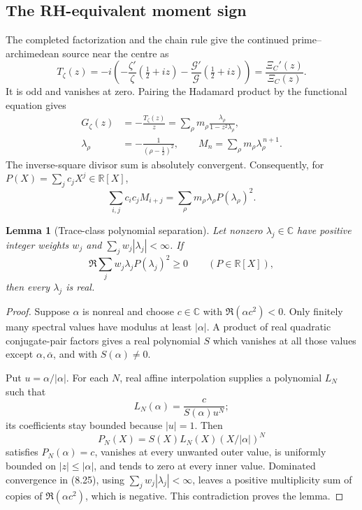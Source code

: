\documentclass[11pt]{article}
\newtheorem{lemma}[theorem]{Lemma}
\newcommand{\C}{\mathbb C}
\newcommand{\R}{\mathbb R}
\newcommand{\cG}{\mathcal G}
\begin{document}
\subsection{The RH-equivalent moment sign}

The completed factorization and the chain rule give the continued prime--archimedean source
near the centre as
\[
 T_\zeta(z)=
 -i\left(
 -\frac{\zeta'}{\zeta}(\tfrac12+iz)
 -\frac{\cG'}{\cG}(\tfrac12+iz)\right)
 =\frac{\Xi_C'(z)}{\Xi_C(z)}.
\tag{8.22}
\]
It is odd and vanishes at zero.  Pairing the Hadamard product by the functional equation gives
\cite[Chapter 2]{Titchmarsh1986}
\[
\begin{aligned}
 G_\zeta(z)
 &=-\frac{T_\zeta(z)}z
 =\sum_\rho m_\rho\frac{\lambda_\rho}{1-z^2\lambda_\rho},\\
 \lambda_\rho&=-\frac1{(\rho-\frac12)^2},\qquad
 M_n=\sum_\rho m_\rho\lambda_\rho^{\,n+1}.
\end{aligned}
\tag{8.23}
\]
The inverse-square divisor sum is absolutely convergent.  Consequently, for
\(P(X)=\sum_jc_jX^j\in\R[X]\),
\[
 \sum_{i,j}c_ic_jM_{i+j}
 =\sum_\rho m_\rho\lambda_\rho P(\lambda_\rho)^2.
\tag{8.24}
\]

\begin{lemma}[Trace-class polynomial separation]\label{lem:trace-separation}
Let nonzero \(\lambda_j\in\C\) have positive integer weights \(w_j\) and
\(\sum_jw_j|\lambda_j|<\infty\).  If
\[
 \Re\sum_jw_j\lambda_jP(\lambda_j)^2\ge0
 \qquad(P\in\R[X]),
\tag{8.25}
\]
then every \(\lambda_j\) is real.
\end{lemma}

\begin{proof}
Suppose \(\alpha\) is nonreal and choose \(c\in\C\) with
\(\Re(\alpha c^2)<0\).  Only finitely many spectral values have modulus at least
\(|\alpha|\).  A product of real quadratic conjugate-pair factors gives a real polynomial
\(S\) which vanishes at all those values except \(\alpha,\overline\alpha\), and with
\(S(\alpha)\ne0\).

Put \(u=\alpha/|\alpha|\).  For each \(N\), real affine interpolation supplies a polynomial
\(L_N\) such that
\[
 L_N(\alpha)=\frac{c}{S(\alpha)u^N};
\tag{8.26}
\]
its coefficients stay bounded because \(|u|=1\).  Then
\[
 P_N(X)=S(X)L_N(X)(X/|\alpha|)^N
\tag{8.27}
\]
satisfies \(P_N(\alpha)=c\), vanishes at every unwanted outer value, is uniformly bounded on
\(|z|\le|\alpha|\), and tends to zero at every inner value.  Dominated convergence in
(8.25), using \(\sum_jw_j|\lambda_j|<\infty\), leaves a positive multiplicity sum of copies of
\(\Re(\alpha c^2)\), which is negative.  This contradiction proves the lemma.
\end{proof}
\end{document}

